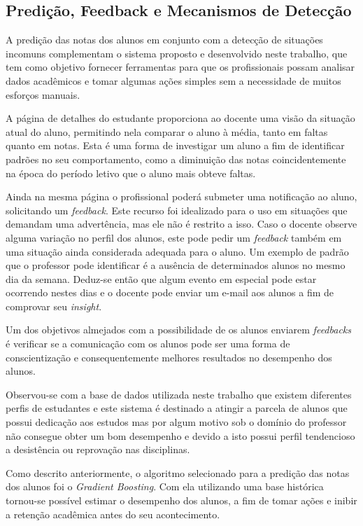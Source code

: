 \subsection{Predição, Feedback e Mecanismos de Detecção}

A predição das notas dos alunos em conjunto com a detecção de situações incomuns complementam o sistema proposto e desenvolvido neste trabalho, que tem como objetivo fornecer ferramentas para que os profissionais possam analisar dados acadêmicos e tomar algumas ações simples sem a necessidade de muitos esforços manuais.

A página de detalhes do estudante proporciona ao docente uma visão da situação atual do aluno, permitindo nela comparar o aluno à média, tanto em faltas quanto em notas. 
Esta é uma forma de investigar um aluno a fim de identificar padrões no seu comportamento, como a diminuição das notas coincidentemente na época do período letivo que o aluno mais obteve faltas.

Ainda na mesma página o profissional poderá submeter uma notificação ao aluno, solicitando um \textit{feedback}. 
Este recurso foi idealizado para o uso em situações que demandam uma advertência, mas ele não é restrito a isso. 
Caso o docente observe alguma variação no perfil dos alunos, este pode pedir um \textit{feedback} também em uma situação ainda considerada adequada para o aluno.
Um exemplo de padrão que o professor pode identificar é a ausência de determinados alunos no mesmo dia da semana. 
Deduz-se então que algum evento em especial pode estar ocorrendo nestes dias e o docente pode enviar um e-mail aos alunos a fim de comprovar seu \textit{insight}.

Um dos objetivos almejados com a possibilidade de os alunos enviarem \textit{feedbacks} é verificar se a comunicação com os alunos pode ser uma forma de conscientização e consequentemente melhores resultados no desempenho dos alunos.

Observou-se com a base de dados utilizada neste trabalho que existem diferentes perfis de estudantes e este sistema é destinado a atingir a parcela de alunos que possui dedicação aos estudos mas por algum motivo sob o domínio do professor não consegue obter um bom desempenho e devido a isto possui perfil tendencioso a desistência ou reprovação nas disciplinas.

Como descrito anteriormente, o algoritmo selecionado para a predição das notas dos alunos foi o \textit{Gradient Boosting}.
Com ela utilizando uma base histórica tornou-se possível estimar o desempenho dos alunos, a fim de tomar ações e inibir a retenção acadêmica antes do seu acontecimento.

